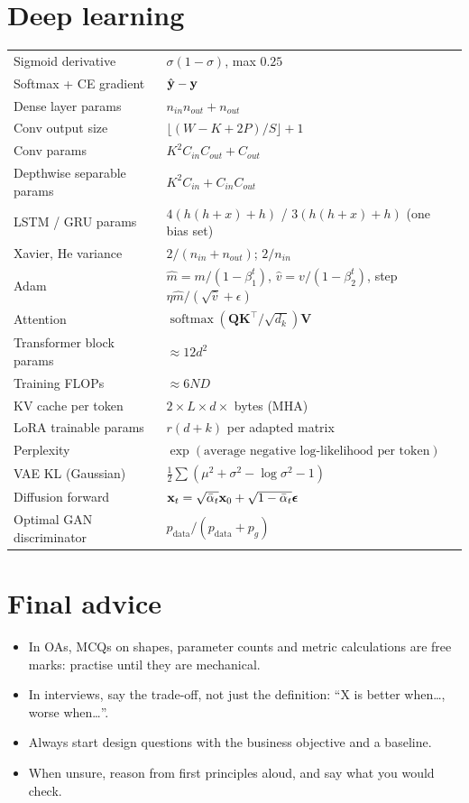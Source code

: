 \section*{Deep learning}
\begin{tabular}{@{}p{}p{}@{}}
\toprule
Sigmoid derivative & $\sigma(1-\sigma)$, max $0.25$\\
Softmax + CE gradient & $\hat{\mathbf{y}}-\mathbf{y}$\\
Dense layer params & $n_{in}n_{out}+n_{out}$\\
Conv output size & $\lfloor(W-K+2P)/S\rfloor+1$\\
Conv params & $K^2C_{in}C_{out}+C_{out}$\\
Depthwise separable params & $K^2C_{in}+C_{in}C_{out}$\\
LSTM / GRU params & $4(h(h+x)+h)$ / $3(h(h+x)+h)$ (one bias set)\\
Xavier, He variance & $2/(n_{in}+n_{out})$;\; $2/n_{in}$\\
Adam & $\hat m=m/(1-\beta_1^t)$, $\hat v=v/(1-\beta_2^t)$, step $\eta\hat m/(\sqrt{\hat v}+\epsilon)$\\
Attention & $\operatorname{softmax}(\mathbf{QK}^\top/\sqrt{d_k})\mathbf{V}$\\
Transformer block params & $\approx12d^2$\\
Training FLOPs & $\approx6ND$\\
KV cache per token & $2\times L\times d\times$ bytes (MHA)\\
LoRA trainable params & $r(d+k)$ per adapted matrix\\
Perplexity & $\exp(\text{average negative log-likelihood per token})$\\
VAE KL (Gaussian) & $\frac12\sum(\mu^2+\sigma^2-\log\sigma^2-1)$\\
Diffusion forward & $\mathbf{x}_t=\sqrt{\bar\alpha_t}\mathbf{x}_0+\sqrt{1-\bar\alpha_t}\bm\epsilon$\\
Optimal GAN discriminator & $p_{\text{data}}/(p_{\text{data}}+p_g)$\\
\bottomrule
\end{tabular}

\section*{Final advice}
\begin{itemize}
  \item In OAs, MCQs on shapes, parameter counts and metric calculations are free marks: practise until they are mechanical.
  \item In interviews, say the trade-off, not just the definition: ``X is better when\dots, worse when\dots''.
  \item Always start design questions with the business objective and a baseline.
  \item When unsure, reason from first principles aloud, and say what you would check.
\end{itemize}
